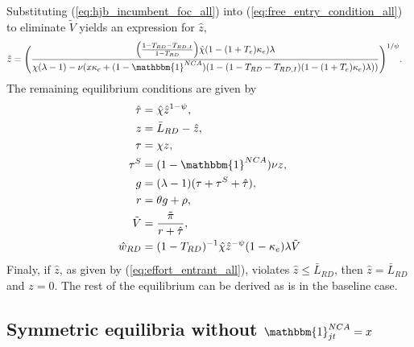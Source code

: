\documentclass[11pt,english]{article}
\theoremstyle{definition}
\begin{document}
Substituting (\ref{eq:hjb_incumbent_foc_all}) into (\ref{eq:free_entry_condition_all}) to eliminate $\tilde{V}$ yields an expression for $\hat{z}$, 
\begin{align}
	\hat{z} &= \Bigg( \frac{\Big(\frac{1-T_{RD} -T_{RD,I}}{1-T_{RD}} \Big)\hat{\chi} (1-(1+T_e)\kappa_{e}) \lambda}{\chi(\lambda -1) - \nu (x\kappa_c  + (1-\mathbbm{1}^{NCA})(1 - (1-T_{RD} - T_{RD,I})(1-(1+T_e)\kappa_e)\lambda)) } \Bigg)^{1/\psi}. \label{eq:effort_entrant_all}
\end{align}
The remaining equilibrium conditions are given by
\begin{align}
	\hat{\tau} &= \hat{\chi} \hat{z}^{1-\psi}, \\
	z &= \bar{L}_{RD} - \hat{z}, \label{eq:labor_resource_constraint_all}\\ 
	\tau &= \chi z, \\
	\tau^S &= (1-\mathbbm{1}^{NCA}) \nu z, \\
	g &= (\lambda - 1) (\tau + \tau^S + \hat{\tau}), \\
	r &= \theta g + \rho, \\
	\tilde{V} &= \frac{\tilde{\pi}}{r + \hat{\tau}}, \\ 
	\hat{w}_{RD} &= (1-T_{RD})^{-1}\hat{\chi} \hat{z}^{-\psi} (1 - \kappa_e) \lambda \tilde{V} \label{eq:wage_rd_labor_all}
\end{align}
Finaly, if $\hat{z}$, as given by (\ref{eq:effort_entrant_all}), violates $\hat{z} \le \bar{L}_{RD}$, then $\hat{z} = \bar{L}_{RD}$ and $z = 0$. The rest of the equilibrium can be derived as is in the baseline case.

\subsection{Symmetric equilibria without $\mathbbm{1}^{NCA}_{jt} = x$}\label{appendix:model:proofs:proposition:mixedstrategyeq}
\end{document}

